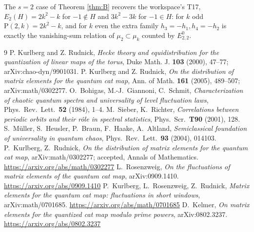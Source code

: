 \documentclass[11pt,reqno]{amsart}
\theoremstyle{definition}
\begin{document}
\noindent
The $s=2$ case of Theorem \ref{thm:B} recovers the workspace's T17,
$E_2(H)=2k^2-k$ for $-1\notin H$ and $3k^2-3k$ for $-1\in H$: for $k$ odd
$\mathrm{P}(2,k)=2k^2-k$, and for $k$ even the extra family
$h_3=-h_1,h_4=-h_2$ is exactly the vanishing-sum relation of $\mu_2\subset\mu_k$
counted by $E^0_{2,2}$.

\begin{thebibliography}{9}
 P. Kurlberg and Z. Rudnick, \emph{Hecke theory and equidistribution for the quantization of linear maps of the torus}, Duke Math. J. \textbf{103} (2000), 47--77; arXiv:chao-dyn/9901031.
 P. Kurlberg and Z. Rudnick, \emph{On the distribution of matrix elements for the quantum cat map}, Ann. of Math. \textbf{161} (2005), 489--507; arXiv:math/0302277.
 O.~Bohigas, M.-J.~Giannoni, C.~Schmit,
  \emph{Characterization of chaotic quantum spectra and universality of level
  fluctuation laws}, Phys.\ Rev.\ Lett.\ \textbf{52} (1984), 1--4.
 M.~Sieber, K.~Richter,
  \emph{Correlations between periodic orbits and their r\^ole in spectral
  statistics}, Phys.\ Scr.\ \textbf{T90} (2001), 128.
 S.~M\"uller, S.~Heusler, P.~Braun, F.~Haake, A.~Altland,
  \emph{Semiclassical foundation of universality in quantum chaos},
  Phys.\ Rev.\ Lett.\ \textbf{93} (2004), 014103.
 P.~Kurlberg, Z.~Rudnick,
  \emph{On the distribution of matrix elements for the quantum cat map},
  arXiv:math/0302277; accepted, Annals of Mathematics.
  \url{https://arxiv.org/abs/math/0302277}
 L.~Rosenzweig,
  \emph{On the fluctuations of matrix elements of the quantum cat map},
  arXiv:0909.1410. \url{https://arxiv.org/abs/0909.1410}
 P.~Kurlberg, L.~Rosenzweig, Z.~Rudnick,
  \emph{Matrix elements for the quantum cat map: fluctuations in short windows},
  arXiv:math/0701685. \url{https://arxiv.org/abs/math/0701685}
 D.~Kelmer,
  \emph{On matrix elements for the quantized cat map modulo prime powers},
  arXiv:0802.3237. \url{https://arxiv.org/abs/0802.3237}
\end{thebibliography}
\end{document}
